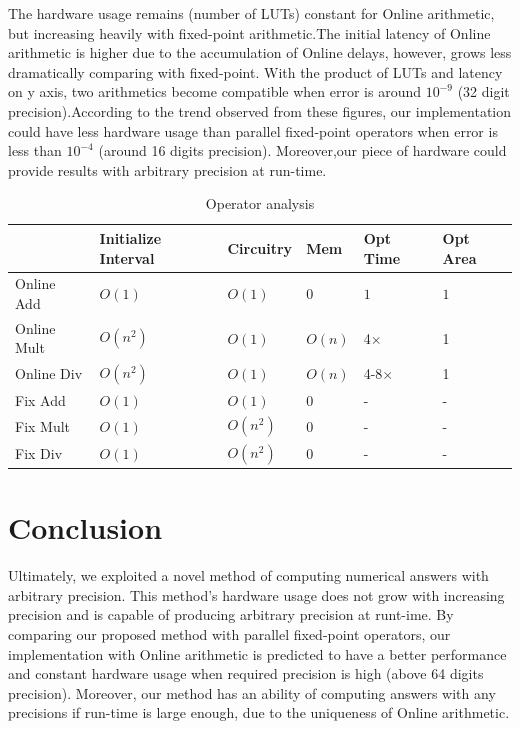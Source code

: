 \documentclass{sig-alternate}
\begin{document}
The hardware usage remains (number of LUTs) constant for Online arithmetic, but increasing heavily with fixed-point arithmetic.The initial latency of Online arithmetic is higher due to the accumulation of Online delays, however, grows less dramatically comparing with fixed-point. With the product of LUTs and latency on y axis, two arithmetics become compatible when error is around $10^{-9}$ (32 digit precision).According to the trend observed from these figures, our implementation could have less hardware usage than parallel fixed-point operators when error is less than $10^{-4}$ (around 16 digits precision). Moreover,our piece of hardware could provide results with arbitrary precision at run-time.
\noindent
\begin {table} [h]
\renewcommand{\arraystretch}{1.1}
\begin{tabular} {|l| p{1.1cm}| l |l |p{0.7cm}|p{0.7cm}| }
	\hline		 
	&	Initialize Interval    &  Circuitry & Mem   &  Opt Time & Opt Area  \\
	\hline
	Online Add       &  $O(1)$  & $O(1)$   &  $0$    &  $1$        & $1$\\
	\hline
	Online Mult  & $O(n^2)$  & $O(1)$   & $O(n)$  &  4$\times$       & 1\\
	\hline
	Online Div       & $O(n^2)$  & $O(1)$   & $O(n)$  &  4-8$\times$     & 1\\
	\hline
	Fix Add        & $O(1)$    & $O(1)$ & $0$& - &-\\
	\hline
	Fix Mult        & $O(1)$    & $O(n^2)$ & $0$& - &-\\
	\hline
	Fix Div        & $O(1)$    & $O(n^2)$ & $0$& - &-\\
	\hline
\end{tabular}
\caption{Operator analysis}
\end{table}
\vspace{-15pt}
\section{Conclusion}
Ultimately, we exploited a novel method of computing numerical answers with arbitrary precision. This method's hardware usage does not grow with increasing precision and is capable of producing arbitrary precision at runt-ime. By comparing our proposed method with parallel fixed-point operators, our implementation with Online arithmetic is predicted to have a better performance and constant hardware usage when required precision is high (above 64 digits precision). Moreover, our method has an ability of computing answers with any precisions if run-time is large enough, due to the uniqueness of Online arithmetic.  

	 
	
	
\end{document}
